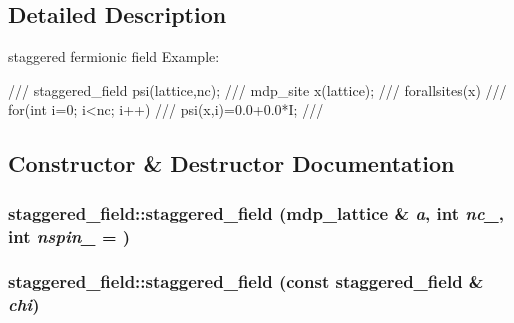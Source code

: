 \subsection{Detailed Description}
staggered fermionic field Example: \begin{DoxyVerb}
/// staggered_field psi(lattice,nc);
/// mdp_site x(lattice);
/// forallsites(x)
///   for(int i=0; i<nc; i++)
///     psi(x,i)=0.0+0.0*I;
/// \end{DoxyVerb}
 

\subsection{Constructor \& Destructor Documentation}
\hypertarget{classstaggered__field_acc7d5a171caf8bda9d0a904c6672432d}{
\subsubsection[{staggered\_\-field}]{\setlength{\rightskip}{0pt plus 5cm}staggered\_\-field::staggered\_\-field ({\bf mdp\_\-lattice} \& {\em a}, \/  int {\em nc\_\-}, \/  int {\em nspin\_\-} = {})}}
\label{classstaggered__field_acc7d5a171caf8bda9d0a904c6672432d}
\hypertarget{classstaggered__field_a22b5b7f7d050f6356451df02356f181d}{
\subsubsection[{staggered\_\-field}]{\setlength{\rightskip}{0pt plus 5cm}staggered\_\-field::staggered\_\-field (const {\bf staggered\_\-field} \& {\em chi})}}
\label{classstaggered__field_a22b5b7f7d050f6356451df02356f181d}


